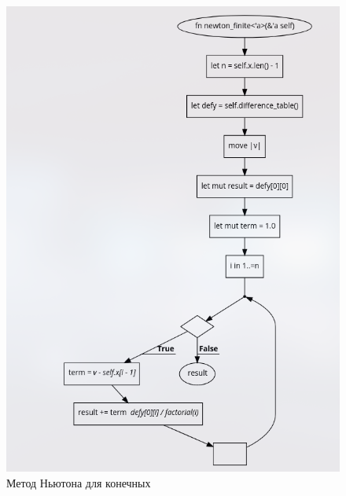 \documentclass{article}
\begin{document}
                 \begin{figure}[H]
                      \centering
                      \includegraphics[width=360pt]{alg3.png}
                      \caption[Схема-1]{Метод Ньютона для конечных}
                      \label{fig:screenshot003}
                \end{figure}    
\end{document}
